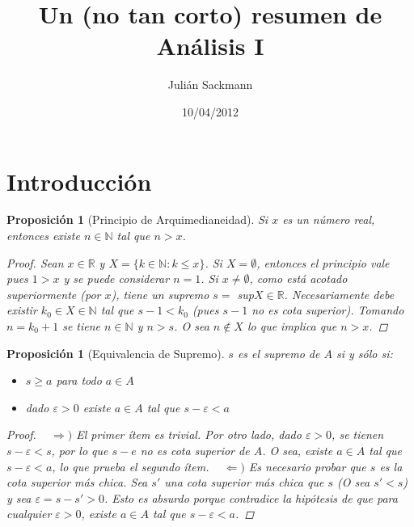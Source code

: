 \documentclass[]{article}
\title{Un (no tan corto) resumen de Análisis I}
\author{ Julián Sackmann }
\date{10/04/2012}
\newtheorem{prop}[teo]{Proposición}
\def\N{\mathbb{N}}
\def\R{\mathbb{R}}
\def\e{\varepsilon}
\begin{document}
\ifpdf
{}
\else
{}
\fi

\maketitle

\section{Introducción}
\begin{prop}[Principio de Arquimedianeidad]
	Si $x$ es un número real, entonces existe $n \in \N$ tal que $n > x$.
\begin{proof}
	Sean $x \in \R$ y $X = \{k \in \N : k \leq x \}$. Si $X = \emptyset$, entonces el principio vale pues $1 > x$ y se puede considerar $n = 1$. Si $x \neq \emptyset$, como está acotado superiormente (por $x$), tiene un supremo $s =$ sup$ X \in \R$. Necesariamente debe existir $k_0 \in X \in \N$ tal que $s - 1 < k_0$ (pues $s - 1$ no es cota superior). Tomando $n = k_0 + 1$ se tiene $n \in \N$ y $n > s$. O sea $n \not\in X$ lo que implica que $n > x$.
\end{proof}
\end{prop}

\begin{prop}[Equivalencia de Supremo]
	$s$ es el supremo de $A$ si y sólo si:
	\begin{itemize}
		\item $s \geq a$ para todo $a \in A$
		\item dado $\e > 0$ existe $a \in A$ tal que $s - \e < a$
	\end{itemize}
\begin{proof}
	~\newline
	$\Rightarrow)$ El primer ítem es trivial. Por otro lado, dado $\e > 0$, se tienen $s - \e < s$, por lo que $s - e$ no es cota superior de $A$. O sea, existe $a \in A$ tal que $s-\e<a$, lo que prueba el segundo ítem.\newline
	~\newline
	$\Leftarrow)$ Es necesario probar que $s$ es la cota superior más chica. Sea $s'$ una cota superior más chica que $s$ (O sea $s' < s$) y sea $\e=s-s'>0$. Esto es absurdo porque contradice la hipótesis de que para cualquier $\e>0$, existe $a\in A$ tal que $s-\e<a$.
\end{proof}
\end{prop}

\newpage
\end{document}
